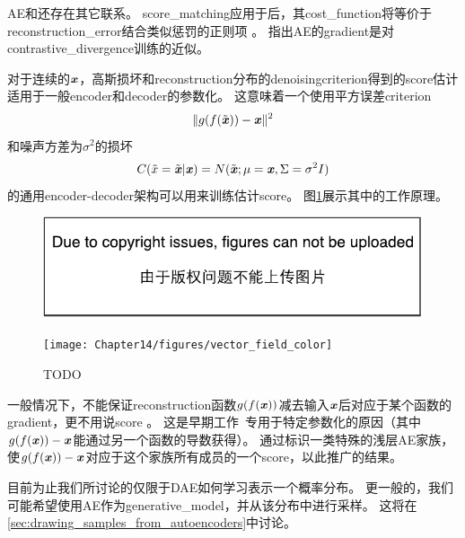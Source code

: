 \gls{AE}和还存在其它联系。
\gls{score_matching}应用于后，其\gls{cost_function}将等价于\gls{reconstruction_error}结合类似惩罚的正则项 \citep{Swersky-ICML2011}。
\citet{Bengio+Delalleau-2009}指出\gls{AE}的\gls{gradient}是对\gls{contrastive_divergence}训练的近似。


对于连续的$\boldsymbol{\mathit{x}}$，高斯损坏和\gls{reconstruction}分布的\gls{denoising}\gls{criterion}得到的\gls{score}估计适用于一般\gls{encoder}和\gls{decoder}的参数化\citep{Alain+Bengio-ICLR2013-small}。
这意味着一个使用平方误差\gls{criterion}
\begin{align}
 \| g(f(\tilde {\boldsymbol{\mathit{x}}})) - \boldsymbol{\mathit{x}} \|^2
\end{align}
和噪声方差为$\sigma^2 $的损坏
\begin{align}
 C(\tilde x = \tilde {\boldsymbol{\mathit{x}}} | \boldsymbol{\mathit{x}}) = N(\tilde {\boldsymbol{\mathit{x}}}; \mu=\boldsymbol{\mathit{x}}, \Sigma = \sigma^2 I)
\end{align}
的通用\gls{encoder}-\gls{decoder}架构可以用来训练估计\gls{score}。
图\ref{fig:chap14_vector_field_color}展示其中的工作原理。

\begin{figure}[!htb]
\ifOpenSource
\centerline{\includegraphics{figure.pdf}}
\else
\centerline{\texttt{[image: Chapter14/figures/vector\_field\_color]}}
\fi
\caption{TODO}
\label{fig:chap14_vector_field_color}
\end{figure}

一般情况下，不能保证\gls{reconstruction}函数$g(f(\boldsymbol{\mathit{x}}))$减去输入$\boldsymbol{\mathit{x}}$后对应于某个函数的\gls{gradient}，更不用说\gls{score} 。
这是早期工作~\citep{Vincent-NC-2011-small}专用于特定参数化的原因（其中$g(f(\boldsymbol{\mathit{x}})) - \boldsymbol{\mathit{x}}$能通过另一个函数的导数获得）。
\citet{Kamyshanska+Memisevic-2015}通过标识一类特殊的浅层\gls{AE}家族，使$g(f(\boldsymbol{\mathit{x}})) - \boldsymbol{\mathit{x}}$对应于这个家族所有成员的一个\gls{score}，以此推广\citet{Vincent-NC-2011-small}的结果。


目前为止我们所讨论的仅限于\gls{DAE}如何学习表示一个概率分布。
更一般的，我们可能希望使用\gls{AE}作为\gls{generative_model}，并从该分布中进行采样。
这将在\ref{sec:drawing_samples_from_autoencoders}中讨论。


